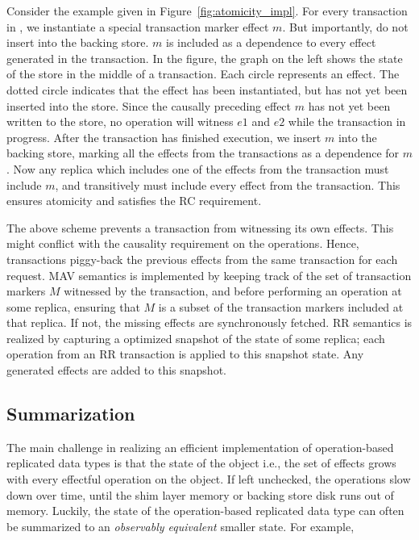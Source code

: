 Consider the example given in Figure~\ref{fig:atomicity_impl}. For every
transaction in \quelea, we instantiate a special transaction marker effect $m$.
But importantly, do not insert into the backing store. $m$ is included as a
dependence to every effect generated in the transaction. In the figure, the
graph on the left shows the state of the store in the middle of a transaction.
Each circle represents an effect. The dotted circle indicates that the effect
has been instantiated, but has not yet been inserted into the store. Since the
causally preceding effect $m$ has not yet been written to the store, no
operation will witness $e1$ and $e2$ while the transaction in progress. After
the transaction has finished execution, we insert $m$ into the backing store,
marking all the effects from the transactions as a dependence for $m$. Now any
replica which includes one of the effects from the transaction must include
$m$, and transitively must include every effect from the transaction. This
ensures atomicity and satisfies the RC requirement.

The above scheme prevents a transaction from witnessing its own effects. This
might conflict with the causality requirement on the operations. Hence,
transactions piggy-back the previous effects from the same transaction for each
request. MAV semantics is implemented by keeping track of the set of
transaction markers $M$ witnessed by the transaction, and before performing an
operation at some replica, ensuring that $M$ is a subset of the transaction
markers included at that replica. If not, the missing effects are synchronously
fetched. RR semantics is realized by capturing a optimized snapshot of the
state of some replica; each operation from an RR transaction is applied to this
snapshot state. Any generated effects are added to this snapshot.

\subsection{Summarization}

The main challenge in realizing an efficient implementation of operation-based
replicated data types is that the state of the object i.e., the set of effects
grows with every effectful operation on the object. If left unchecked, the
operations slow down over time, until the shim layer memory or backing store
disk runs out of memory. Luckily, the state of the operation-based replicated
data type can often be summarized to an \emph{observably equivalent} smaller
state. For example,

